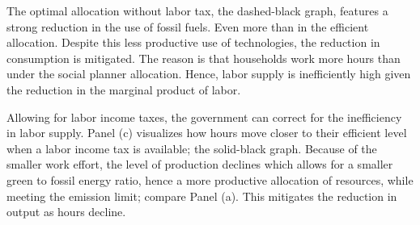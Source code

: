 The optimal allocation without labor tax, the dashed-black graph, features a strong reduction in the use of fossil fuels. Even more than in the efficient allocation. Despite this less productive use of technologies, the reduction in consumption is mitigated. The reason is that households work more hours than under the social planner allocation. Hence, labor supply is inefficiently high given the reduction in the marginal product of labor.  %

Allowing for labor income taxes, the government can correct for the inefficiency in labor supply. Panel (c) visualizes how hours move closer to their efficient level when a labor income tax is available; the solid-black graph. Because of the smaller work effort, the level of production declines which allows for a smaller green to fossil energy ratio, hence a more productive allocation of resources, while meeting the emission limit; compare Panel (a). This mitigates the reduction in output as hours decline. 


